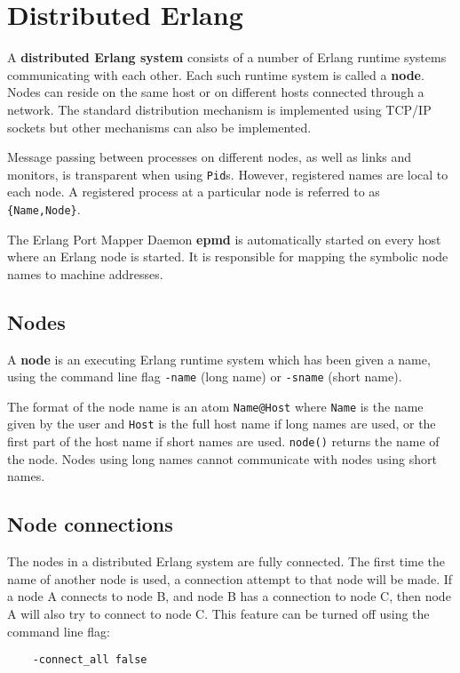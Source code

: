 \chapter{Distributed Erlang}
\label{distribution}

A \textbf{distributed Erlang system} consists of a number of Erlang
runtime systems communicating with each other. Each such runtime
system is called a \textbf{node}.  Nodes can reside on the same
host or on different hosts connected through a network.  The
standard distribution mechanism is implemented using TCP/IP sockets
but other mechanisms can also be implemented.

Message passing between processes on different nodes, as well as links
and monitors, is transparent when using \texttt{Pid}s.  However, registered
names are local to each node.  A registered process at a particular
node is referred to as \texttt{\{Name,Node\}}.

The Erlang Port Mapper Daemon \textbf{epmd} is automatically started
on every host where an Erlang node is started.  It is responsible for
mapping the symbolic node names to machine addresses.


\section{Nodes}
A \textbf{node} is an executing Erlang runtime system which has been
given a name, using the command line flag \texttt{-name} (long name)
or \texttt{-sname} (short name).

The format of the node name is an atom \texttt{Name@Host} where
\texttt{Name} is the name given by the user and \texttt{Host} is the
full host name if long names are used, or the first part of the host
name if short names are used. \texttt{node()} returns the name of the
node. Nodes using long names cannot communicate with nodes using
short names.


\section{Node connections}
The nodes in a distributed Erlang system are fully connected. The
first time the name of another node is used, a connection attempt to
that node will be made. If a node A connects to node B, and node B has
a connection to node C, then node A will also try to connect to node
C. This feature can be turned off using the command line flag:

\texttt{~~~~-connect\_all false}

